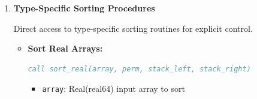 \begin{enumerate}
\begin{enumerate}
                  \begin{itemize}
                    \item \textbf{Generic Procedure:}
                          \begin{lstlisting}[language=Fortran]
call sort_array(array, perm, stack_left, stack_right)
                          \end{lstlisting}
                          \begin{itemize}
                            \item \texttt{array}: Input array to sort (real, integer, or
                                  character)
                                  
                            \item \texttt{perm}: Permutation vector that will be reordered
                                  
                            \item \texttt{stack\_left}: Work array for left indices (size =
                                  array size)
                                  
                            \item \texttt{stack\_right}: Work array for right indices (size
                                  = array size)
                          \end{itemize}
                          
                          \textbf{Supported Types:}
                          \begin{lstlisting}[language=Fortran]
! Real arrays
real(real64) :: data_real(:)
! Integer arrays  
integer(int32) :: data_int(:)
! Character arrays
character(len=*) :: data_char(:)
                          \end{lstlisting}
                  \end{itemize}
                  
            \item \textbf{Type-Specific Sorting Procedures}
                  
                  Direct access to type-specific sorting routines for explicit control.
                  
                  \begin{itemize}
                    \item \textbf{Sort Real Arrays:}
                          \begin{lstlisting}[language=Fortran]
call sort_real(array, perm, stack_left, stack_right)
                          \end{lstlisting}
                          \begin{itemize}
                            \item \texttt{array}: Real(real64) input array to sort
                                  

\end{itemize}
\end{itemize}
\end{enumerate}
\end{enumerate}
